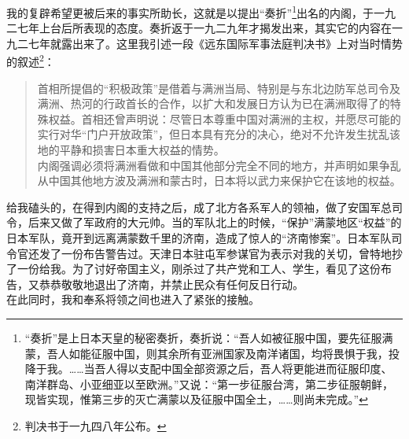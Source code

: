 我的复辟希望更被后来的事实所助长，这就是以提出“奏折”\footnote{“奏折”是上日本天皇的秘密奏折，奏折说：“吾人如被征服中国，要先征服满蒙，吾人如能征服中国，则其余所有亚洲国家及南洋诸国，均将畏惧于我，投降于我。……当吾人得以支配中国全部资源之后，吾人将更能进而征服印度、南洋群岛、小亚细亚以至欧洲。”又说：“第一步征服台湾，第二步征服朝鲜，现皆实现，惟第三步的灭亡满蒙以及征服中国全土，……则尚未完成。”}出名的内阁，于一九二七年上台后所表现的态度。奏折返于一九二九年才揭发出来，其实它的内容在一九二七年就露出来了。这里我引述一段《远东国际军事法庭判决书》上对当时情势的叙述\footnote{判决书于一九四八年公布。}：\\

\begin{quote}
	首相所提倡的“积极政策”是借着与满洲当局、特别是与东北边防军总司令及满洲、热河的行政首长的合作，以扩大和发展日方认为已在满洲取得了的特殊权益。首相还曾声明说：尽管日本尊重中国对满洲的主权，并愿尽可能的实行对华“门户开放政策”，但日本具有充分的决心，绝对不允许发生扰乱该地的平静和损害日本重大权益的情势。\\

内阁强调必须将满洲看做和中国其他部分完全不同的地方，并声明如果争乱从中国其他地方波及满洲和蒙古时，日本将以武力来保护它在该地的权益。\\
\end{quote}

给我磕头的，在得到内阁的支持之后，成了北方各系军人的领袖，做了安国军总司令，后来又做了军政府的大元帅。当的军队北上的时候，“保护”满蒙地区“权益”的日本军队，竟开到远离满蒙数千里的济南，造成了惊人的“济南惨案”。日本军队司令官还发了一份布告警告过。天津日本驻屯军参谋官为表示对我的关切，曾特地抄了一份给我。为了讨好帝国主义，刚杀过了共产党和工人、学生，看见了这份布告，又恭恭敬敬地退出了济南，并禁止民众有任何反日行动。\\

在此同时，我和奉系将领之间也进入了紧张的接触。\\

